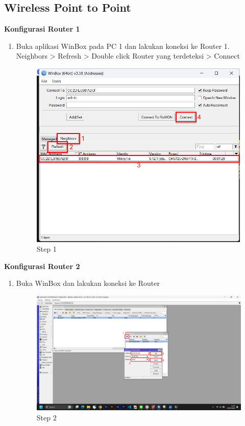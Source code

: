 \subsection{Wireless Point to Point}
\begin{center}

	\textbf{Konfigurasi Router 1}
	\begin{enumerate}
		\item Buka aplikasi WinBox pada PC 1 dan lakukan koneksi ke Router 1.\\Neighbors > Refresh > Double click Router yang terdeteksi > Connect
			\begin{figure}[H]
				\centering
				\includegraphics[width=0.8\linewidth]{P1/img/per1/pc1/Step 1.png}
				\caption{Step 1}
				\label{fig:Step 1(Per.1 PC1)}
			\end{figure}
	\end{enumerate}

	\textbf{Konfigurasi Router 2}
	\begin{enumerate}
		\item Buka WinBox dan lakukan koneksi ke Router
			\begin{figure}[H]
				\centering
				\includegraphics[width=0.9\linewidth]{P1/img/per1/pc2/Step 2.png}
				\caption{Step 2}
				\label{fig:Step 2(Per.1 PC2)}
			\end{figure}
	\end{enumerate}


\end{center}
